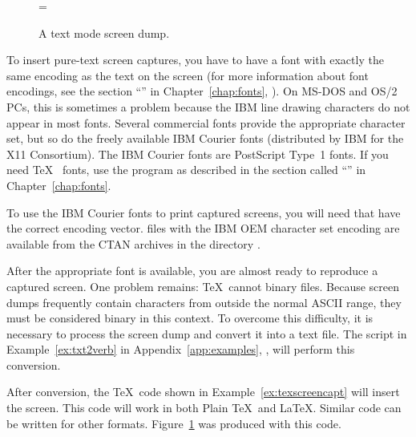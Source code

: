 \begin{figure}
  =\vbox{}
  \begin{center}
    \leavevmode{}
    \caption{A text mode screen dump.}
    \label{fig:textshot}
  \end{center}
\end{figure}

To insert pure-text screen captures, you have to have a font
with exactly the same encoding as the text on the screen (for more
information about font encodings, see the section
``''
in Chapter~\ref{chap:fonts}, {\it {}}).  On
MS-DOS and OS/2 PCs, this is sometimes a problem because the IBM line
drawing characters do not appear in most fonts.  Several commercial
fonts provide the appropriate character set, but so do the freely
available IBM Courier fonts (distributed by IBM for the X11
Consortium).  
The IBM Courier fonts are PostScript Type~1 fonts.  If you need \TeX\ 
 fonts, use the  program as described in 
the section called ``\nameref{sec:t1fonts}'' in Chapter~\ref{chap:fonts}.

\newpage
To use the IBM Courier fonts to print captured screens, you
will need  that have the correct encoding vector.
\ext{AFM} files with the IBM OEM character set encoding are available
from the CTAN archives in the directory \ctandir{fonts/courier}.

After the appropriate font is available, you are almost ready to
reproduce a captured screen.  One problem remains: \TeX\ cannot
 binary files.  Because screen dumps frequently contain
characters from outside the normal ASCII range, they must be
considered binary in this context.  To overcome this
difficulty, it is necessary to process the screen dump and convert it
into a text file.  The \program{Perl} script in
Example~\ref{ex:txt2verb} in Appendix~\ref{app:examples}, \textit{}, will perform this conversion.


After conversion, the \TeX\ code shown in Example~\ref{ex:texscreencapt} will
insert the screen. This code will work in both Plain \TeX\ and \LaTeX.  Similar
code can be written for other formats. Figure~\ref{fig:textshot} was produced
with this code.

